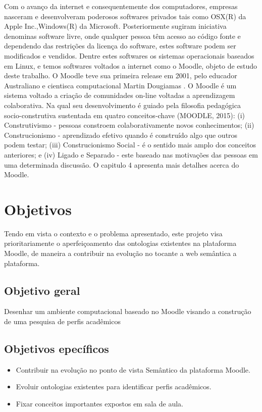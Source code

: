 Com o avanço da internet e consequentemente dos computadores, empresas nasceram e desenvolveram poderosos softwares privados tais como OSX(R) da Apple Inc.,Windows(R) da Microsoft. Posteriormente sugiram iniciativa denominas software livre, onde qualquer pessoa têm acesso ao código fonte e dependendo das restrições da licença do software, estes software podem ser modificados e vendidos. Dentre estes softwares os sistemas operacionais baseados em Linux, e temos softwares voltados a internet como o Moodle, objeto de estudo deste trabalho. O Moodle teve sua primeira release em 2001, pelo educador Australiano e cientisca computacional Martin Dougiamas \cite{moodle}. O Moodle é um sistema voltado a criação de comunidades on-line voltadas a aprendizagem colaborativa. Na qual seu desenvolvimento é guiado pela filosofia pedagógica socio-construtiva sustentada em quatro conceitos-chave (MOODLE, 2015): (i) Construtivismo - pessoas constroem colaborativamente novos conhecimentos; (ii) Construcionismo - aprendizado efetivo quando é construído algo que outros podem testar; (iii) Construcionismo Social - é o sentido mais amplo dos conceitos anteriores; e (iv) Ligado e Separado - este baseado nas motivações das pessoas em uma determinada discussão. O capitulo  4 apresenta mais detalhes acerca do Moodle.

\section{Objetivos}
Tendo em vista o contexto e o problema apresentado, este projeto visa prioritariamente o aperfeiçoamento das ontologias existentes na plataforma Moodle, de maneira a contribuir na evolução no tocante a web semântica a plataforma.
\subsection{Objetivo geral}
	Desenhar um ambiente computacional baseado no Moodle visando a construção de uma pesquisa de perfis acadêmicos
\subsection{Objetivos epecíficos}
\begin{itemize}
  \item Contribuir na evolução no ponto de vista Semântico da plataforma Moodle.
  \item Evoluir ontologias existentes para identificar perfis acadêmicos.
	\item Fixar conceitos importantes expostos em sala de aula.
\end{itemize}



